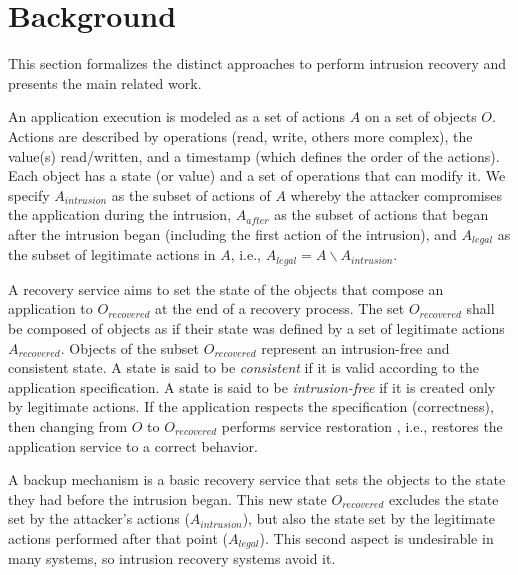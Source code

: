 
\section{Background}\label{sec:background}

This section formalizes the distinct approaches to perform intrusion recovery and presents the main related work. 

An application execution is modeled as a set of actions $A$ on a set of objects $O$. Actions are described by operations (read, write, others more complex), the value(s) read/written, and a timestamp (which defines the order of the actions). Each object has a state (or value) and a set of operations that can modify it. We specify $A_{intrusion}$ as the subset of actions of $A$ whereby the attacker compromises the application during the intrusion, $A_{after}$ as the subset of actions that began after the intrusion began (including the first action of the intrusion), and $A_{legal}$ as the subset of legitimate actions in $A$, i.e., $A_{legal} = A \backslash A_{intrusion}$.

A recovery service aims to set the state of the objects that compose an application to $O_{recovered}$ at the end of a recovery process. The set $O_{recovered}$ shall be composed of objects as if their state was defined by a set of legitimate actions $A_{recovered}$. Objects of the subset $O_{recovered}$ represent an intrusion-free and consistent state. A state is said to be \textit{consistent} if it is valid according to the application specification. A state is said to be \textit{intrusion-free} if it is created only by legitimate actions. If the application respects the specification (correctness), then changing from $O$ to $O_{recovered}$ performs service restoration \cite{Aviz}, i.e., restores the application service to a correct behavior. %

A backup mechanism is a basic recovery service that sets the objects to the state they had before the intrusion began. This new state $O_{recovered}$ excludes the state set by the attacker's actions ($A_{intrusion}$), but also the state set by the legitimate actions performed after that point ($A_{legal}$). This second aspect is undesirable in many systems, so intrusion recovery systems avoid it.

